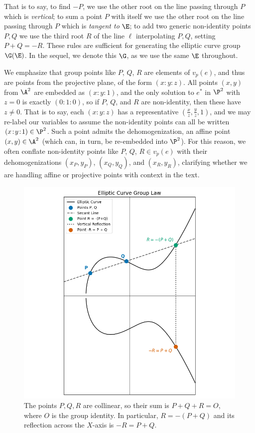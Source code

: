 \documentclass[11pt,letterpaper]{article}
\theoremstyle{definition}
\newcommand{\6}{\mathbf}
\newcommand{\7}{\mathcal}
\begin{document}
That is to say, to find $-P$, we use the other root on the line passing through $P$ which is \textit{vertical}; to sum a point $P$ with itself we use the other root on the line passing through $P$ which is \textit{tangent to} $\E$; to add two generic non-identity points $P, Q$ we use the third root $R$ of the line $\ell$ interpolating $P, Q$, setting $P + Q = -R$.
These rules are sufficient for generating the elliptic curve group $\G(\E)$. In the sequel, we denote this $\G$, as we use the same $\E$ throughout.

We emphasize that group points like $P$, $Q$, $R$ are elements of $v_p(e)$, and thus are points from the projective plane, of the form $(x\!:\!y\!:\!z)$. All points $(x,y)$ from $\A^2$ are embedded as $(x\!:\!y\!:\!1)$, and the only solution to $e^*$ in $\P^2$ with $z= 0$ is exactly $(0\!:\!1\!:\!0)$, so if $P$, $Q$, and $R$ are non-identity, then these have $z \neq 0$. That is to say, each $(x\!:\!y\!:\!z)$ has a representative $(\frac{x}{z}, \frac{y}{z}, 1)$, and we may re-label our variables to assume the non-identity points can all be written $(x\!:\!y\!:\!1) \in \P^2$. Such a point admits the dehomogenization, an affine point $(x,y) \in \A^2$ (which can, in turn, be re-embedded into $\P^2$). 
For this reason, we often conflate non-identity points like $P$, $Q$, $R \in v_p(e)$ with their dehomogenizations $(x_P, y_P)$, $(x_Q, y_Q)$, and $(x_R, y_R)$, clarifying whether we are handling affine or projective points with context in the text.


\begin{figure}[htbp]
\centering
\includegraphics[width=\textwidth]{ecg.png}
\caption{The points $P, Q, R$ are collinear, so their sum is $P + Q + R = O$, where $O$ is the group identity. In particular, $R = -(P+Q)$ and its reflection across the $X$-axis is $-R = P+Q$. \label{fig:grouplaw}}
\end{figure}
\end{document}
